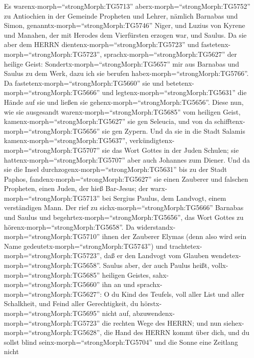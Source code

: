  Es warenx-morph=``strongMorph:TG5713''
aberx-morph=``strongMorph:TG5752'' zu Antiochien in der Gemeinde
Propheten und Lehrer, nämlich Barnabas und Simon,
genanntx-morph=``strongMorph:TG5746'' Niger, und Luzius von Kyrene und
Manahen, der mit Herodes dem Vierfürsten erzogen war, und Saulus.
 Da sie aber dem HERRN dientenx-morph=``strongMorph:TG5723''
und fastetenx-morph=``strongMorph:TG5723'',
sprachx-morph=``strongMorph:TG5627'' der heilige Geist:
Sondertx-morph=``strongMorph:TG5657'' mir aus Barnabas und Saulus zu dem
Werk, dazu ich sie berufen habex-morph=``strongMorph:TG5766''.
 Da fastetenx-morph=``strongMorph:TG5660'' sie und
betetenx-morph=``strongMorph:TG5666'' und
legtenx-morph=``strongMorph:TG5631'' die Hände auf sie und ließen sie
gehenx-morph=``strongMorph:TG5656''.  Diese nun, wie sie
ausgesandt warenx-morph=``strongMorph:TG5685'' vom heiligen Geist,
kamenx-morph=``strongMorph:TG5627'' sie gen Seleucia, und von da
schifftenx-morph=``strongMorph:TG5656'' sie gen Zypern.  Und
da sie in die Stadt Salamis kamenx-morph=``strongMorph:TG5637'',
verkündigtenx-morph=``strongMorph:TG5707'' sie das Wort Gottes in der
Juden Schulen; sie hattenx-morph=``strongMorph:TG5707'' aber auch
Johannes zum Diener.  Und da sie die Insel
durchzogenx-morph=``strongMorph:TG5631'' bis zu der Stadt Paphos,
fandenx-morph=``strongMorph:TG5627'' sie einen Zauberer und falschen
Propheten, einen Juden, der hieß Bar-Jesus;  der
warx-morph=``strongMorph:TG5713'' bei Sergius Paulus, dem Landvogt,
einem verständigen Mann. Der rief zu sichx-morph=``strongMorph:TG5666''
Barnabas und Saulus und begehrtex-morph=``strongMorph:TG5656'', das Wort
Gottes zu hörenx-morph=``strongMorph:TG5658''.  Da
widerstandx-morph=``strongMorph:TG5710'' ihnen der Zauberer Elymas (denn
also wird sein Name gedeutetx-morph=``strongMorph:TG5743'') und
trachtetex-morph=``strongMorph:TG5723'', daß er den Landvogt vom Glauben
wendetex-morph=``strongMorph:TG5658''.  Saulus aber, der
auch Paulus heißt, vollx-morph=``strongMorph:TG5685'' heiligen Geistes,
sahx-morph=``strongMorph:TG5660'' ihn an  und
sprachx-morph=``strongMorph:TG5627'': O du Kind des Teufels, voll aller
List und aller Schalkheit, und Feind aller Gerechtigkeit, du
hörstx-morph=``strongMorph:TG5695'' nicht auf,
abzuwendenx-morph=``strongMorph:TG5723'' die rechten Wege des HERRN;
 und nun siehex-morph=``strongMorph:TG5628'', die Hand des
HERRN kommt über dich, und du sollst blind
seinx-morph=``strongMorph:TG5704'' und die Sonne eine Zeitlang nicht
